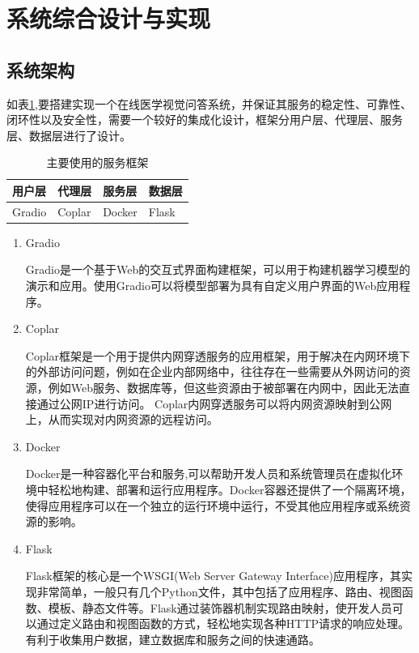 \section{系统综合设计与实现}
\subsection{系统架构}
如表\ref{tab:sys_lib},要搭建实现一个在线医学视觉问答系统，并保证其服务的稳定性、可靠性、闭环性以及安全性，需要一个较好的集成化设计，框架分用户层、代理层、服务层、数据层进行了设计。

\begin{table}
    \caption{\label{tab:sys_lib}主要使用的服务框架}
    \centering
    \begin{tabular}{llll}
        \hline 用户层 & 代理层 & 服务层 & 数据层 \\
        \hline Gradio & Coplar & Docker & Flask \\
        \hline
        \end{tabular}
\end{table}	
\begin{enumerate}[topsep = 0 pt, itemsep= 0 pt, parsep=0pt, partopsep=0pt, leftmargin=0pt, itemindent=44pt, labelsep=6pt, listparindent=22pt, label=(\arabic*)]
	\item Gradio
	
	Gradio是一个基于Web的交互式界面构建框架，可以用于构建机器学习模型的演示和应用。使用Gradio可以将模型部署为具有自定义用户界面的Web应用程序。
	\item Coplar
	
	Coplar框架是一个用于提供内网穿透服务的应用框架，用于解决在内网环境下的外部访问问题，例如在企业内部网络中，往往存在一些需要从外网访问的资源，例如Web服务、数据库等，但这些资源由于被部署在内网中，因此无法直接通过公网IP进行访问。
	Coplar内网穿透服务可以将内网资源映射到公网上，从而实现对内网资源的远程访问。
	\item Docker
	
	Docker是一种容器化平台和服务,可以帮助开发人员和系统管理员在虚拟化环境中轻松地构建、部署和运行应用程序。Docker容器还提供了一个隔离环境，使得应用程序可以在一个独立的运行环境中运行，不受其他应用程序或系统资源的影响。
	\item Flask
	
	Flask框架的核心是一个WSGI(Web Server Gateway Interface)应用程序，其实现非常简单，一般只有几个Python文件，其中包括了应用程序、路由、视图函数、模板、静态文件等。Flask通过装饰器机制实现路由映射，使开发人员可以通过定义路由和视图函数的方式，轻松地实现各种HTTP请求的响应处理。
	有利于收集用户数据，建立数据库和服务之间的快速通路。
\end{enumerate}

